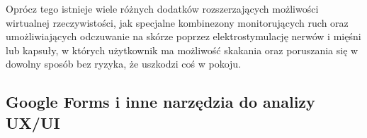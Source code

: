 Oprócz tego istnieje wiele różnych dodatków rozszerzających możliwości wirtualnej rzeczywistości, jak specjalne kombinezony monitorujących ruch oraz umożliwiających odczuwanie na skórze poprzez elektrostymulację nerwów i mięśni lub kapsuły, w których użytkownik ma możliwość skakania oraz poruszania się w dowolny sposób bez ryzyka, że uszkodzi coś w pokoju.

\subsection{Google Forms i inne narzędzia do analizy UX/UI}









